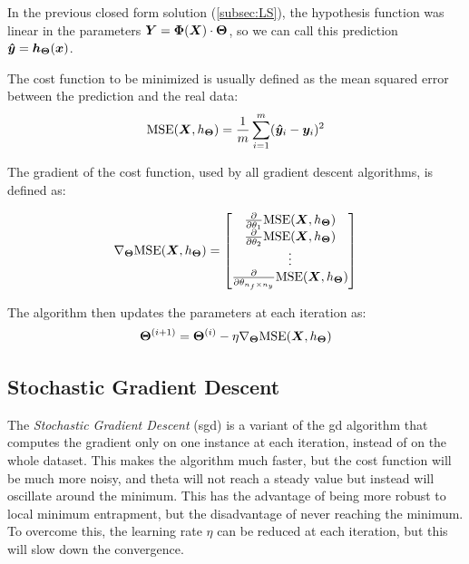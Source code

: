 In the previous closed form solution (\autoref{subsec:LS}), the hypothesis function was linear in the parameters $\bm{Y} = \bm{\Phi}(\bm{X})\cdot\bm{\Theta}$, so we can call this prediction $\bm{\hat{y}} = \bm{h}_{\bm{\Theta}}(\bm{x})$.

The cost function to be minimized is usually defined as the mean squared error between the prediction and the real data:
\begin{equation}
    \text{MSE}(\bm{X}, h_{\bm{\Theta}}) = \frac{1}{m}\sum_{i=1}^{m}(\bm{\hat{y}}_i - \bm{y}_i)^2
\end{equation}


The gradient of the cost function, used by all gradient descent algorithms, is defined as:

\begin{equation}
\nabla_{\bm{\Theta}} \text{MSE}(\bm{X}, h_{\bm{\Theta}}) = 
\begin{bmatrix}
    \frac{\partial}{\partial \theta_1} \text{MSE}(\bm{X}, h_{\bm{\Theta}}) \\
    \frac{\partial}{\partial \theta_2} \text{MSE}(\bm{X}, h_{\bm{\Theta}}) \\
    \vdots \\
    \frac{\partial}{\partial \theta_{n_f\times n_y}} \text{MSE}(\bm{X}, h_{\bm{\Theta}}) \\
\end{bmatrix}
\end{equation}

The algorithm then updates the parameters at each iteration as:
\begin{equation}
    \bm{\Theta}^{(i+1)} = \bm{\Theta}^{(i)} - \eta \nabla_{\bm{\Theta}} \text{MSE}(\bm{X}, h_{\bm{\Theta}})
\end{equation}


\subsection{Stochastic Gradient Descent}
\label{subsec:SGD}
The \emph{Stochastic Gradient Descent} (\gls{sgd}) is a variant of the \gls{gd} algorithm that computes the gradient only on one instance at each iteration, instead of on the whole dataset. This makes the algorithm much faster, but the cost function will be much more noisy, and theta will not reach a steady value but instead will oscillate around the minimum. This has the advantage of being more robust to local minimum entrapment, but the disadvantage of never reaching the minimum. To overcome this, the learning rate $\eta$ can be reduced at each iteration, but this will slow down the convergence.

